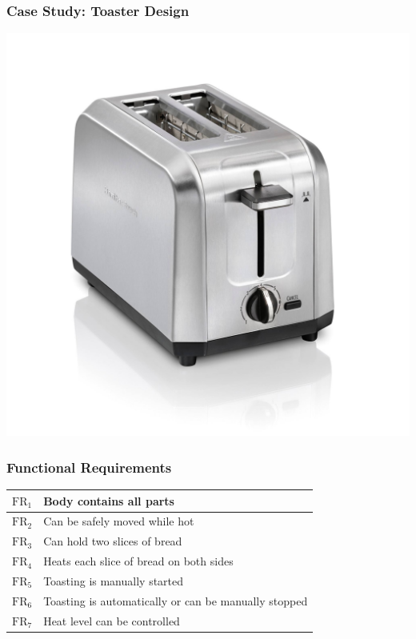 \documentclass{beamer}
\newcommand{\FR}{\text{FR}}
\begin{document}
\begin{frame}
  \frametitle{Case Study: Toaster Design}
  \begin{center}
    \includegraphics[scale=0.1]{../final/toaster}
  \end{center}
\end{frame}

\begin{frame}
  \frametitle{Functional Requirements}
  \begin{center}
    \begin{tabular}{|c|l|}
      \hline
      \(\FR_1\) & Body contains all parts \\
      \hline
      \(\FR_2\) & Can be safely moved while hot \\
      \hline
      \(\FR_3\) & Can hold two slices of bread \\
      \hline
      \(\FR_4\) & Heats each slice of bread on both sides \\
      \hline
      \(\FR_5\) & Toasting is manually started \\
      \hline
      \(\FR_6\) & Toasting is automatically or can be manually stopped \\
      \hline
      \(\FR_7\) & Heat level can be controlled \\
      \hline
    \end{tabular}
  \end{center}
\end{frame}
\end{document}
